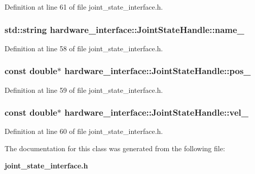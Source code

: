\-Definition at line 61 of file joint\-\_\-state\-\_\-interface.\-h.

\subsubsection[{name\-\_\-}]{\setlength{\rightskip}{0pt plus 5cm}std\-::string {\bf hardware\-\_\-interface\-::\-Joint\-State\-Handle\-::name\-\_\-}\hspace{0.3cm}{\ttfamily  [private]}}\label{classhardware__interface_1_1JointStateHandle_a907ee3caeb0ee79275ca1aabe13a3802}


\-Definition at line 58 of file joint\-\_\-state\-\_\-interface.\-h.

\subsubsection[{pos\-\_\-}]{\setlength{\rightskip}{0pt plus 5cm}const double$\ast$ {\bf hardware\-\_\-interface\-::\-Joint\-State\-Handle\-::pos\-\_\-}\hspace{0.3cm}{\ttfamily  [private]}}\label{classhardware__interface_1_1JointStateHandle_ab8550eb758f049d1a3dcd7c0fb7cc185}


\-Definition at line 59 of file joint\-\_\-state\-\_\-interface.\-h.

\subsubsection[{vel\-\_\-}]{\setlength{\rightskip}{0pt plus 5cm}const double$\ast$ {\bf hardware\-\_\-interface\-::\-Joint\-State\-Handle\-::vel\-\_\-}\hspace{0.3cm}{\ttfamily  [private]}}\label{classhardware__interface_1_1JointStateHandle_aaa0ac8272dee92ee297cbc49f8553991}


\-Definition at line 60 of file joint\-\_\-state\-\_\-interface.\-h.



\-The documentation for this class was generated from the following file\-:\begin{DoxyCompactItemize}
\item 
{\bf joint\-\_\-state\-\_\-interface.\-h}\end{DoxyCompactItemize}
